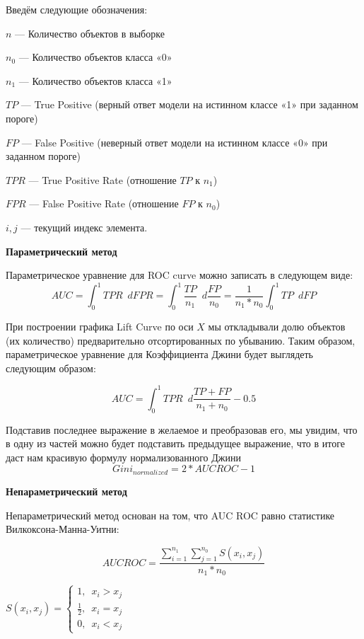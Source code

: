 \documentclass{article}
\begin{document}
Введём следующие обозначения:

$n$ — Количество объектов в выборке

$n_0$ — Количество объектов класса «0»

$n_1$ — Количество объектов класса «1»

$TP$ — True Positive (верный ответ модели на истинном классе «1» при заданном пороге)

$FP$ — False Positive (неверный ответ модели на истинном классе «0» при заданном пороге)

$TPR$ — True Positive Rate (отношение $TP$ к $n_1$)

$FPR$ — False Positive Rate (отношение $FP$ к $n_0$)

$i, j$ — текущий индекс элемента.


{\bf Параметрический метод}

Параметрическое уравнение для ROC curve можно записать в следующем виде:
$$AUC = \int_{0}^{1} TPR \enspace dFPR = \int_{0}^{1} \frac{TP}{n_1} \enspace d\frac{FP}{n_0} = \frac{1}{n_1*n_0}\int_{0}^{1}TP \enspace dFP $$


При построении графика Lift Curve по оси $X$ мы откладывали долю объектов (их количество) предварительно отсортированных по убыванию. Таким образом, параметрическое уравнение для Коэффициента Джини будет выглядеть следующим образом:

$$AUC = \int_{0}^{1} TPR \enspace d\frac{TP + FP}{n_1+n_0} - 0.5 $$



Подставив последнее выражение в желаемое и преобразовав его, мы увидим, что в одну из частей можно будет подставить предыдущее выражение, что в итоге даст нам красивую формулу нормализованного Джини
$$Gini_{normalized} = 2 * AUCROC - 1$$

{\bf Непараметрический метод}

Непараметрический метод основан на том, что AUC ROC равно статистике Вилкоксона-Манна-Уитни:

$$AUCROC = \frac{\sum_{i=1}^{n_1} \sum_{j=1}^{n_0} S(x_i, x_j)}{n_1*n_0} $$


\begin{center}
$S(x_i, x_j) = \begin{cases} 1, \enspace x_i > x_j\\ \frac{1}{2}, \enspace x_i = x_j \\ 0,\enspace x_i < x_j \end{cases}$
\end{center}
\end{document}
